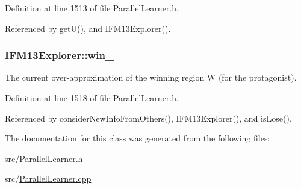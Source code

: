 Definition at line 1513 of file Parallel\-Learner.\-h.



Referenced by get\-U(), and I\-F\-M13\-Explorer().

\hypertarget{classIFM13Explorer_ac18c17a8e34556f0ad500c471a74f6ce}{
\subsubsection[{win\-\_\-}]{ I\-F\-M13\-Explorer\-::win\-\_\-\hspace{0.3cm}{\ttfamily [protected]}}}\label{classIFM13Explorer_ac18c17a8e34556f0ad500c471a74f6ce}


The current over-\/approximation of the winning region W (for the protagonist). 



Definition at line 1518 of file Parallel\-Learner.\-h.



Referenced by consider\-New\-Info\-From\-Others(), I\-F\-M13\-Explorer(), and is\-Lose().



The documentation for this class was generated from the following files\-:\begin{DoxyCompactItemize}
\item 
src/\hyperlink{ParallelLearner_8h}{Parallel\-Learner.\-h}\item 
src/\hyperlink{ParallelLearner_8cpp}{Parallel\-Learner.\-cpp}\end{DoxyCompactItemize}
